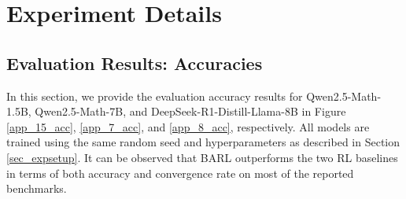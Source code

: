 \section{Experiment Details}\label{app_more_exp}
\subsection{Evaluation Results: Accuracies}\label{app_acc_eval}
In this section, we provide the evaluation accuracy results for Qwen2.5-Math-1.5B, Qwen2.5-Math-7B, and DeepSeek-R1-Distill-Llama-8B in Figure \ref{app_15_acc}, \ref{app_7_acc}, and \ref{app_8_acc}, respectively. All models are trained using the same random seed and hyperparameters as described in Section \ref{sec_expsetup}. It can be observed that BARL outperforms the two RL baselines in terms of both accuracy and convergence rate on most of the reported benchmarks. 

